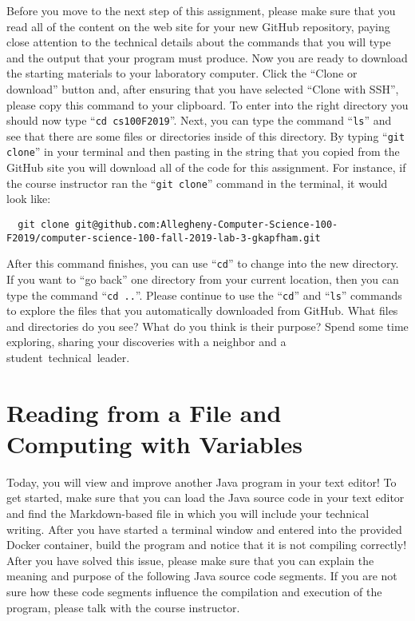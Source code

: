 \documentclass[11pt]{article}
\newcommand{\command}[1]{``\lstinline{#1}''}
\newcommand{\step}[1]{``{#1}''}
\begin{document}
Before you move to the next step of this assignment, please make sure that you
read all of the content on the web site for your new GitHub repository, paying
close attention to the technical details about the commands that you will type
and the output that your program must produce. Now you are ready to download the
starting materials to your laboratory computer. Click the ``Clone or download''
button and, after ensuring that you have selected ``Clone with SSH'', please
copy this command to your clipboard. To enter into the right directory you
should now type \command{cd cs100F2019}. Next, you can type the command
\command{ls} and see that there are some files or directories inside of this
directory. By typing \command{git clone} in your terminal and then pasting in
the string that you copied from the GitHub site you will download all of the
code for this assignment. For instance, if the course instructor ran the
\command{git clone} command in the terminal, it would look like:

\begin{lstlisting}
  git clone git@github.com:Allegheny-Computer-Science-100-F2019/computer-science-100-fall-2019-lab-3-gkapfham.git
\end{lstlisting}

After this command finishes, you can use \command{cd} to change into the new
directory. If you want to \step{go back} one directory from your current
location, then you can type the command \command{cd ..}. Please continue to use
the \command{cd} and \command{ls} commands to explore the files that you
automatically downloaded from GitHub. What files and directories do you see?
What do you think is their purpose? Spend some time exploring, sharing your
discoveries with a neighbor and a \mbox{student technical leader}.

\section*{Reading from a File and Computing with Variables}

Today, you will view and improve another Java program in your text editor! To
get started, make sure that you can load the Java source code in your text
editor and find the Markdown-based file in which you will include your technical
writing. After you have started a terminal window and entered into the provided
Docker container, build the program and notice that it is not compiling
correctly! After you have solved this issue, please make sure that you can
explain the meaning and purpose of the following Java source code segments. If
you are not sure how these code segments influence the compilation and execution
of the program, please talk with the course instructor.
\end{document}
